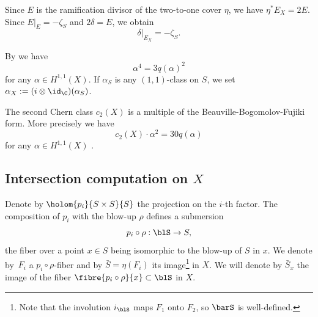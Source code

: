 Since $E$ is the ramification divisor of the two-to-one cover $\eta$, we have $\eta^* E_X = 2 E$.
Since $E|_E = -\zeta_S$ and $2 \delta = E$, we obtain
\begin{equation} \label{restrictdelta}
\delta|_{E_X} = - \zeta_S.
\end{equation}

By \cite[\S 9, Lem.\,1]{Bea83} we have
\begin{equation} \label{qsurface}
\alpha^4 = 3 q(\alpha)^2
\end{equation}
for any $\alpha\in H^{1,1} (X)$. If $\alpha_S$ is any $(1,1)$-class on $S$, we set $\alpha_X:= (i \otimes \id_\C)(\alpha_S)$.

The second Chern class $c_2(X)$ is a multiple of the Beauville-Bogomolov-Fujiki form. More precisely we have
\begin{equation} \label{qctwo}
c_2(X) \cdot \alpha^2 = 30 q(\alpha)
\end{equation}
for any $\alpha\in H^{1,1} (X)$ \cite[\S 3.1]{Ott15}.

\subsection{Intersection computation on $X$}

Denote by $\holom{p_i}{S \times S}{S}$ the projection on the $i$-th factor.
The composition of $p_i$ with the blow-up $\rho$ defines a submersion
\[
p_i \circ \rho: \blS \to S,
\]
the fiber over a point $x \in S$ being isomorphic to the blow-up of $S$ in $x$.
We denote by~$F_i$ a $p_i \circ \rho$-fiber and by $\bar S = \eta(F_i)$ its image\footnote{Note that the involution $i_{\blS}$ maps $F_1$ onto $F_2$, so $\barS$ is well-defined.} in $X$.
We will denote by $\bar S_x$ the image of the fiber $\fibre{p_i \circ \rho}{x} \subset \blS$ in $X$.

